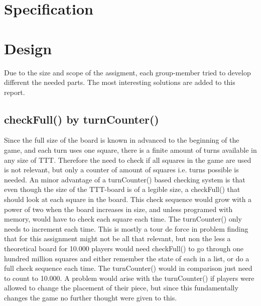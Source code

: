 \documentclass[a4paper,10pt]{article}
\begin{document}
	
	\section{Specification} 
	
	
	\section{Design}
	Due to the size and scope of the assigment, each group-member tried to develop different the needed parts. The most interesting solutions are added to this report.   
\subsection{checkFull() by turnCounter()}
Since the full size of the board is known in advanced to the beginning of the game, and each turn uses one square,  there is a finite amount of turns available in any size of TTT. Therefore the need to check if all squares in the game are used is not relevant, but only a counter of amount of squares i.e. turns possible is needed. 
An minor advantage of a turnCounter() based checking system is that even though the size of the TTT-board is of a legible size, a checkFull() that should look at each square in the board. This check sequence would grow with a power of two when the board increases in size, and unless programed with memory, would have to check each square each time. The turnCounter() only needs to increment each time. 
This is mostly a tour de force in problem finding that for this assignment might not be all that relevant, but non the less a theoretical board for 10.000 players would need checkFull() to go through one hundred million squares and either remember the state of each in a list, or do a full check sequence each time. The turnCounter() would in comparison just need to count to 10.000.
A problem would arise with the turnCounter() if players were allowed to change the placement of their piece, but since this fundamentally changes the game no further thought were given to this.
\end{document}
